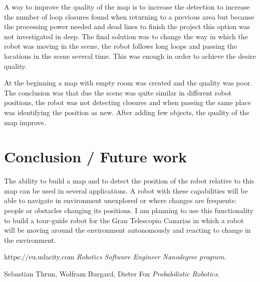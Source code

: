 \documentclass[10pt,journal,compsoc]{IEEEtran}
\begin{document}
A way to improve the quality of the map is to increase the detection to increase the number of loop closures found when returning to a previous area but because the processing power needed and dead lines to finish the project this option was not investigated in deep. The final solution was to change the way in which the robot was moving in the scene, the robot follows long loops and passing the locations in the scene several time. This was enough in order to achieve the desire quality.

At the beginning a map with empty room was created and the quality was poor. The conclusion was that due the scene was quite similar in different robot positions, the robot was not detecting closures and when passing the same place was identifying the position as new. After adding few objects, the quality of the map improve.  
\section{Conclusion / Future work}

The ability to build a map and to detect the position of the robot relative to this map can be used in several applications. A robot with these capabilities will be able to navigate in environment unexplored or where changes are frequents: people or obstacles changing its positions. I am planning to use this functionality to build a tour-guide robot for the Gran Telescopio Canarias in which a robot will be moving around the environment autonomously and reacting to change in the environment.

\begin{thebibliography}{9}


https://eu.udacity.com
\textit{Robotics Software Engineer Nanodegree program}. 

Sebastian Thrun, Wolfram Burgard, Dieter Fox
\textit{Probabilistic Robotics}. 
\end{thebibliography}
\end{document}
